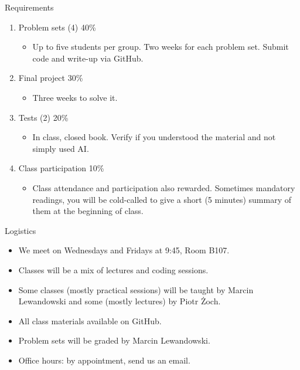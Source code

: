 \documentclass[11pt,xcolor={dvipsnames},aspectratio=159,hyperref={pdftex,pdfpagemode=UseNone,hidelinks,pdfdisplaydoctitle=true},usepdftitle=false]{beamer}
\begin{document}
\begin{frame}{Requirements}
    \begin{enumerate}
    \item Problem sets (4) 40\%
    \begin{itemize}
        \item \footnotesize{Up to five students per group. Two weeks for each problem set. Submit code and write-up via GitHub.}
    \end{itemize}
    
    \item Final project 30\%
    \begin{itemize}
        \item \footnotesize{Three weeks to solve it.}
    \end{itemize}
    \item Tests (2) 20\%
    \begin{itemize}
        \item \footnotesize{In class, closed book. Verify if you understood the material and not simply used AI.}
    \end{itemize}
    \item Class participation 10\%
    \begin{itemize}
        \item \footnotesize{Class attendance and participation also rewarded. Sometimes mandatory
        readings, you will be cold-called to give a short (5 minutes) summary of them at
        the beginning of class.}
    \end{itemize}
    \end{enumerate}

\end{frame}

\begin{frame}{Logistics}
    \begin{itemize}
    \item We meet on Wednesdays and Fridays at 9:45, Room B107.
    \item Classes will be a mix of lectures and coding sessions. 
    \item Some classes (mostly practical sessions) will be taught by Marcin Lewandowski and some (mostly lectures) by Piotr Żoch. 
    \item All class materials available on GitHub. 
    \item Problem sets will be graded by Marcin Lewandowski. 
    \item Office hours: by appointment, send us an email. 
    \end{itemize}
\end{frame}
\end{document}

